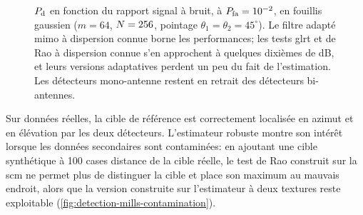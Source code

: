 %
%
\begin{figure}[htbp]
  \centering
  
  \provPdRsbQR[1cm]
  \caption{$P_{\mathrm{d}}$ en fonction du rapport signal à bruit, à $P_{\mathrm{fa}}=10^{-2}$, en
  fouillis gaussien ($m=64$, $N=256$, pointage $\theta_1=\theta_2=45^\circ$).
  Le filtre adapté mimo à dispersion connue borne les performances; les tests
  glrt et de Rao à dispersion connue s'en approchent à quelques dixièmes de dB,
  et leurs versions adaptatives perdent un peu du fait de l'estimation. Les
  détecteurs mono-antenne restent en retrait des détecteurs bi-antennes.
  \provPdRsb}
  \label{fig:detection-mills-pd-rsb}
\end{figure}


Sur données réelles, la cible de référence est correctement localisée en azimut et en élévation par les deux détecteurs. L'estimateur robuste montre son intérêt lorsque les données secondaires sont contaminées: en ajoutant une cible synthétique à 100 cases distance de la cible réelle, le test de Rao construit sur la scm ne permet plus de distinguer la cible et place son maximum au mauvais endroit, alors que la version construite sur l'estimateur à deux textures reste exploitable (\cref{fig:detection-mills-contamination}).

